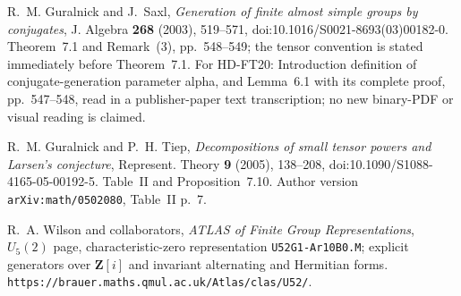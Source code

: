  R.~M. Guralnick and J.~Saxl,
\emph{Generation of finite almost simple groups by conjugates},
J. Algebra \textbf{268} (2003), 519--571,
doi:10.1016/S0021-8693(03)00182-0.
Theorem~7.1 and Remark~(3), pp.~548--549; the tensor convention is
stated immediately before Theorem~7.1.
For HD-FT20: Introduction definition of conjugate-generation parameter alpha, and Lemma~6.1 with its complete proof, pp.~547--548, read in a publisher-paper text transcription; no new binary-PDF or visual reading is claimed.

 R.~M. Guralnick and P.~H. Tiep,
\emph{Decompositions of small tensor powers and Larsen's conjecture},
Represent. Theory \textbf{9} (2005), 138--208,
doi:10.1090/S1088-4165-05-00192-5.
Table~II and Proposition~7.10.  Author version
\texttt{arXiv:math/0502080}, Table~II p.~7.

 R.~A. Wilson and collaborators,
\emph{ATLAS of Finite Group Representations},
$U_5(2)$ page, characteristic-zero representation
\texttt{U52G1-Ar10B0.M}; explicit generators over $\mathbf Z[i]$
and invariant alternating and Hermitian forms.
\texttt{https://brauer.maths.qmul.ac.uk/Atlas/clas/U52/}.
